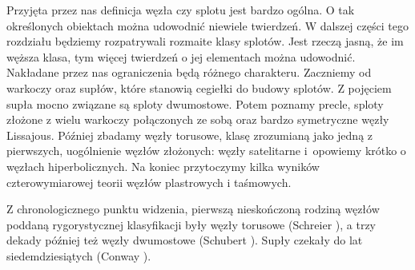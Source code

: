 
Przyjęta przez nas definicja węzła czy splotu jest bardzo ogólna.
O tak określonych obiektach można udowodnić niewiele twierdzeń.
W dalszej części tego rozdziału będziemy rozpatrywali rozmaite klasy splotów.
Jest rzeczą jasną, że im węższa klasa, tym więcej twierdzeń o jej elementach można udowodnić.
Nakładane przez nas ograniczenia będą różnego charakteru.
Zaczniemy od warkoczy oraz supłów, które stanowią cegiełki do budowy splotów.
Z pojęciem supła mocno związane są sploty dwumostowe.
Potem poznamy precle, sploty złożone z wielu warkoczy połączonych ze sobą oraz bardzo symetryczne węzły Lissajous.
Później zbadamy węzły torusowe, klasę zrozumianą jako jedną z pierwszych, uogólnienie węzłów złożonych: węzły satelitarne i~opowiemy krótko o węzłach hiperbolicznych.
Na koniec przytoczymy kilka wyników czterowymiarowej teorii węzłów plastrowych i taśmowych.

Z chronologicznego punktu widzenia, pierwszą nieskończoną rodziną węzłów poddaną rygorystycznej klasyfikacji były węzły torusowe (Schreier \cite{schreier1924}), a trzy dekady później też węzły dwumostowe (Schubert \cite{schubert1956}).
Supły czekały do lat siedemdziesiątych (Conway \cite{conway1970}).
%
%

